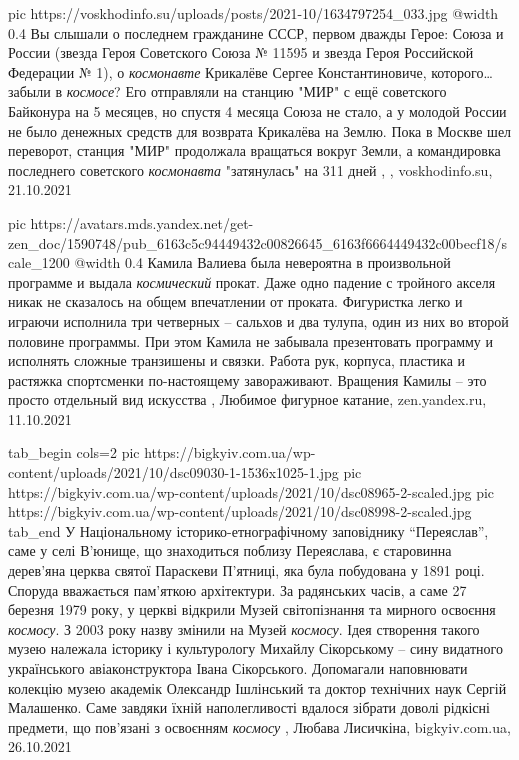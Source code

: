 \ifcmt
  pic https://voskhodinfo.su/uploads/posts/2021-10/1634797254_033.jpg
  @width 0.4
\fi
Вы слышали о последнем гражданине СССР, первом дважды Герое: Союза и России
(звезда Героя Советского Союза № 11595 и звезда Героя Российской Федерации №
1), о \emph{космонавте} Крикалёве Сергее Константиновиче, которого… забыли в
\emph{космосе}?  Его отправляли на станцию "МИР" с ещё советского Байконура на
5 месяцев, но спустя 4 месяца Союза не стало, а у молодой России не было
денежных средств для возврата Крикалёва на Землю. Пока в Москве шел переворот,
станция "МИР" продолжала вращаться вокруг Земли, а командировка последнего
советского \emph{космонавта} "затянулась" на 311 дней
, , voskhodinfo.su, 21.10.2021

\ifcmt
  pic https://avatars.mds.yandex.net/get-zen_doc/1590748/pub_6163c5c94449432c00826645_6163f6664449432c00becf18/scale_1200
  @width 0.4
\fi
Камила Валиева была невероятна в произвольной программе и выдала \emph{космический}
прокат. Даже одно падение с тройного акселя никак не сказалось на общем
впечатлении от проката. Фигуристка легко и играючи исполнила три четверных –
сальхов и два тулупа, один из них во второй половине программы. При этом Камила
не забывала презентовать программу и исполнять сложные транзишены и связки.
Работа рук, корпуса, пластика и растяжка спортсменки по-настоящему
завораживают. Вращения Камилы – это просто отдельный вид искусства
, 
Любимое фигурное катание, zen.yandex.ru, 11.10.2021 


\ifcmt
  tab_begin cols=2
     pic https://bigkyiv.com.ua/wp-content/uploads/2021/10/dsc09030-1-1536x1025-1.jpg
     pic https://bigkyiv.com.ua/wp-content/uploads/2021/10/dsc08965-2-scaled.jpg
		 pic https://bigkyiv.com.ua/wp-content/uploads/2021/10/dsc08998-2-scaled.jpg
  tab_end
\fi
У Національному  історико-етнографічному заповіднику \enquote{Переяслав}, саме
у селі В’юнище,  що знаходиться поблизу  Переяслава,  є старовинна дерев’яна
церква святої Параскеви П’ятниці, яка була побудована у 1891 році. Споруда
вважається пам’яткою архітектури.  За радянських часів, а саме 27 березня 1979
року, у церкві відкрили Музей світопізнання та мирного освоєння \emph{космосу}.
З 2003 року назву змінили на Музей \emph{космосу}. Ідея створення такого музею
належала історику і культурологу Михайлу Сікорському – сину видатного
українського авіаконструктора Івана Сікорського. Допомагали наповнювати
колекцію музею академік Олександр Ішлінський та доктор технічних наук Сергій
Малашенко.  Саме завдяки їхній наполегливості вдалося зібрати доволі рідкісні
предмети, що пов’язані з освоєнням \emph{космосу} 
, 
Любава Лисичкіна, bigkyiv.com.ua, 26.10.2021

